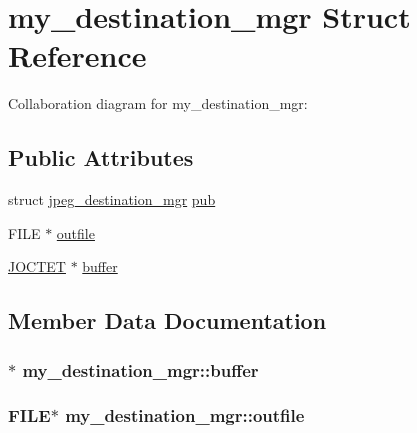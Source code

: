 \hypertarget{structmy__destination__mgr}{}\section{my\+\_\+destination\+\_\+mgr Struct Reference}
\label{structmy__destination__mgr}


Collaboration diagram for my\+\_\+destination\+\_\+mgr\+:
\subsection*{Public Attributes}
\begin{DoxyCompactItemize}
\item 
struct \hyperlink{structjpeg__destination__mgr}{jpeg\+\_\+destination\+\_\+mgr} \hyperlink{structmy__destination__mgr_a79800f27d02bb0446203ecf552034980}{pub}
\item 
F\+I\+L\+E $\ast$ \hyperlink{structmy__destination__mgr_a759400870db2885a9c7cf49d8d3ce38e}{outfile}
\item 
\hyperlink{jmorecfg_8h_a356ad249f20e691b520da439f92cccbc}{J\+O\+C\+T\+E\+T} $\ast$ \hyperlink{structmy__destination__mgr_aa93f525223299889fb3e491a7df3d412}{buffer}
\end{DoxyCompactItemize}


\subsection{Member Data Documentation}
\hypertarget{structmy__destination__mgr_aa93f525223299889fb3e491a7df3d412}{}
\subsubsection[{buffer}]{$\ast$ my\+\_\+destination\+\_\+mgr\+::buffer}\label{structmy__destination__mgr_aa93f525223299889fb3e491a7df3d412}
\hypertarget{structmy__destination__mgr_a759400870db2885a9c7cf49d8d3ce38e}{}
\subsubsection[{outfile}]{\setlength{\rightskip}{0pt plus 5cm}F\+I\+L\+E$\ast$ my\+\_\+destination\+\_\+mgr\+::outfile}\label{structmy__destination__mgr_a759400870db2885a9c7cf49d8d3ce38e}
\hypertarget{structmy__destination__mgr_a79800f27d02bb0446203ecf552034980}{}

